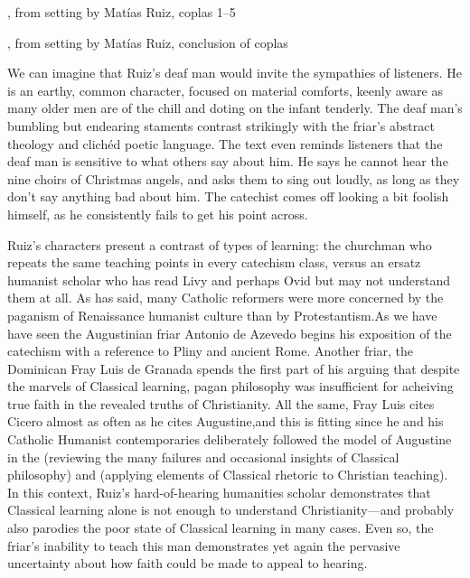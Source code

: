 \begin{expoem}
\caption{, from setting by Matías Ruiz, coplas 1--5}
\label{expoem:Pues_la_fiesta-Ruiz-coplas-1}
\end{expoem}

\begin{expoem}
\caption{, from setting by Matías Ruiz, conclusion of coplas}
\label{expoem:Pues_la_fiesta-Ruiz-coplas-2}
\end{expoem}



We can imagine that Ruiz's deaf man would invite the sympathies of listeners.
He is an earthy, common character, focused on material comforts, keenly aware as many older men are of the chill and doting on the infant tenderly.
The deaf man's bumbling but endearing staments contrast strikingly with the friar's abstract theology and clichéd poetic language.
The text even reminds listeners that the deaf man is sensitive to what others say about him.
He says he cannot hear the nine choirs of Christmas angels, and asks them to sing out loudly, as long as they don't say anything bad about him.
The catechist comes off looking a bit foolish himself, as he consistently fails to get his point across.

Ruiz's characters present a contrast of types of learning: the churchman who repeats the same teaching points in every catechism class, versus an ersatz humanist scholar who has read Livy and perhaps Ovid but may not understand them at all.
As \XXX{} has said, many Catholic reformers were more concerned by the paganism of Renaissance humanist culture than by Protestantism.
As we have have seen the Augustinian friar Antonio de Azevedo begins his exposition of the catechism with a reference to Pliny and ancient Rome.
Another friar, the Dominican Fray Luis de Granada spends the first part of his  arguing that despite the marvels of Classical learning, pagan philosophy was insufficient for acheiving true faith in the revealed truths of Christianity.
All the same, Fray Luis cites Cicero almost as often as he cites Augustine, and this is fitting since he and his Catholic Humanist contemporaries deliberately followed the model of Augustine in the  (reviewing the many failures and occasional insights of Classical philosophy) and  (applying elements of Classical rhetoric to Christian teaching).\citXXX{}
In this context, Ruiz's hard-of-hearing humanities scholar demonstrates that Classical learning alone is not enough to understand Christianity---and probably also parodies the poor state of Classical learning in many cases.
Even so, the friar's inability to teach this man demonstrates yet again the pervasive uncertainty about how faith could be made to appeal to hearing.

